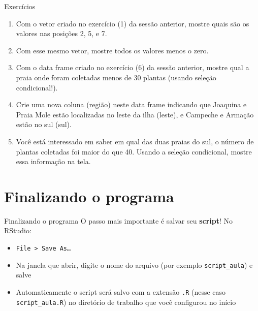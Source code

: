 \documentclass[10pt,handout]{beamer}\usepackage[]{graphicx}\usepackage[]{color}
\begin{document}
\begin{frame}[fragile]{Exercícios}
  \begin{enumerate}
  \item Com o vetor criado no exercício (1) da sessão anterior, mostre
    quais são os valores nas posições 2, 5, e 7.
  \item Com esse mesmo vetor, mostre todos os valores menos o zero.
  \item Com o data frame criado no exercício (6) da sessão anterior,
    mostre qual a praia onde foram coletadas menos de 30 plantas (usando
    seleção condicional!).
  \item Crie uma nova coluna (região) neste data frame indicando que
    Joaquina e Praia Mole estão localizadas no leste da ilha (leste), e
    Campeche e Armação estão no sul (sul).
  \item Você está interessado em saber em qual das duas praias do sul, o
    número de plantas coletadas foi maior do que 40. Usando a seleção
    condicional, mostre essa informação na tela.
  \end{enumerate}
\end{frame}

\section{Finalizando o programa}

\begin{frame}[fragile]{Finalizando o programa}
O passo mais importante é salvar seu \textbf{script}! No RStudio:
\begin{itemize}
\item \texttt{File > Save As\ldots}
\item Na janela que abrir, digite o nome do arquivo (por exemplo
  \texttt{script\_aula}) e salve
\item Automaticamente o script será salvo com a extensão \texttt{.R}
  (nesse caso \texttt{script\_aula.R}) no diretório de trabalho que você
  configurou no início
\end{itemize}
\end{frame}
\end{document}
